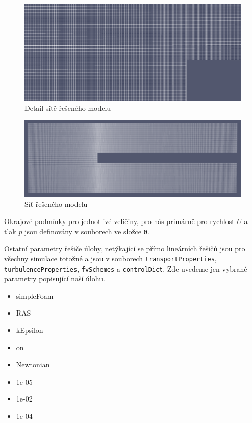 \documentclass[a4paper,12pt]{report}
\theoremstyle{remark}
\begin{document}
\begin{figure}[H]
	\centering
	\includegraphics[width=1\linewidth]{pv-mesh-detail.png}
	\caption{Detail sítě řešeného modelu}
	\label{fig:pvmesh-detail}
\end{figure}



\begin{figure}[H]
	\centering
	\includegraphics[width=1\linewidth]{pv-mesh.png}
	\caption{Síť řešeného modelu}
	\label{fig:pvmesh}
\end{figure}


Okrajové podmínky pro jednotlivé veličiny, pro nás primárně pro rychlost $U$ a tlak $p$  jsou definovány v souborech ve složce \texttt{0}.

Ostatní parametry řešiče úlohy, netýkající se přímo lineárních řešičů jsou pro všechny simulace totožné a jsou v souborech \texttt{transportProperties}, \texttt{turbulenceProperties}, \texttt{fvSchemes} a \texttt{controlDict}. Zde uvedeme jen vybrané parametry popisující naší úlohu.

\begin{itemize}
	\item{simpleFoam}
	\item{RAS}
	\item{kEpsilon}
	\item{on}
	\item{Newtonian}
	\item{1e-05}
	\item{1e-02}
	\item{1e-04}
\end{itemize}
\end{document}
